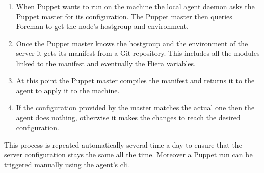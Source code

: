 \begin{enumerate}

\item When Puppet wants to run on the machine the local agent daemon asks
the Puppet master for its configuration. The Puppet master then queries
Foreman to get the node's hostgroup and environment.

\item Once the Puppet master knows the hostgroup and the environment of
the server it gets its manifest from a Git repository. This includes all
the modules linked to the manifest and eventually the Hiera variables.

\item At this point the Puppet master compiles the manifest and returns it
to the agent to apply it to the machine.

\item If the configuration provided by the master matches the actual one
then the agent does nothing, otherwise it makes the changes to reach the
desired configuration.

\end{enumerate}

This process is repeated automatically several time a day to ensure that
the server configuration stays the same all the time. Moreover a Puppet
run can be triggered manually using the agent's cli.

